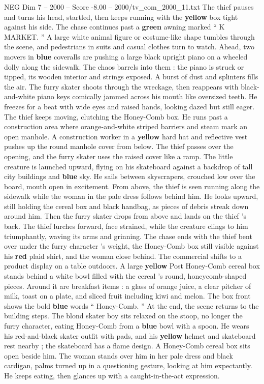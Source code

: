 \begin{textsample}{NEG Dim 7 – 2000 – Score -8.00 – 2000/tv\_com\_2000\_11.txt}
The thief pauses and turns his head, startled, then keeps running with the \textbf{yellow} box tight against his side.
The chase continues past a \textbf{green} awning marked “ K MARKET. ” A large white animal figure or costume-like shape tumbles through the scene, and pedestrians in suits and casual clothes turn to watch.
Ahead, two movers in \textbf{blue} coveralls are pushing a large black upright piano on a wheeled dolly along the sidewalk.
The chaos barrels into them : the piano is struck or tipped, its wooden interior and strings exposed.
A burst of dust and splinters fills the air.
The furry skater shoots through the wreckage, then reappears with black-and-white piano keys comically jammed across his mouth like oversized teeth.
He freezes for a beat with wide eyes and raised hands, looking dazed but still eager.
The thief keeps moving, clutching the Honey-Comb box.
He runs past a construction area where orange-and-white striped barriers and steam mark an open manhole.
A construction worker in a \textbf{yellow} hard hat and reflective vest pushes up the round manhole cover from below.
The thief passes over the opening, and the furry skater uses the raised cover like a ramp.
The little creature is launched upward, flying on his skateboard against a backdrop of tall city buildings and \textbf{blue} sky.
He sails between skyscrapers, crouched low over the board, mouth open in excitement.
From above, the thief is seen running along the sidewalk while the woman in the pale dress follows behind him.
He looks upward, still holding the cereal box and black handbag, as pieces of debris streak down around him.
Then the furry skater drops from above and lands on the thief ’s back.
The thief lurches forward, face strained, while the creature clings to him triumphantly, waving its arms and grinning.
The chase ends with the thief bent over under the furry character ’s weight, the Honey-Comb box still visible against his \textbf{red} plaid shirt, and the woman close behind.
The commercial shifts to a product display on a table outdoors.
A large \textbf{yellow} Post Honey-Comb cereal box stands behind a white bowl filled with the cereal ’s round, honeycomb-shaped pieces.
Around it are breakfast items : a glass of orange juice, a clear pitcher of milk, toast on a plate, and sliced fruit including kiwi and melon.
The box front shows the bold \textbf{blue} words “ Honey-Comb. ” At the end, the scene returns to the building steps.
The blond skater boy sits relaxed on the stoop, no longer the furry character, eating Honey-Comb from a \textbf{blue} bowl with a spoon.
He wears his red-and-black skater outfit with pads, and his \textbf{yellow} helmet and skateboard rest nearby ; the skateboard has a flame design.
A Honey-Comb cereal box sits open beside him.
The woman stands over him in her pale dress and black cardigan, palms turned up in a questioning gesture, looking at him expectantly.
He keeps eating, then glances up with a caught-in-the-act expression.

\end{textsample}
